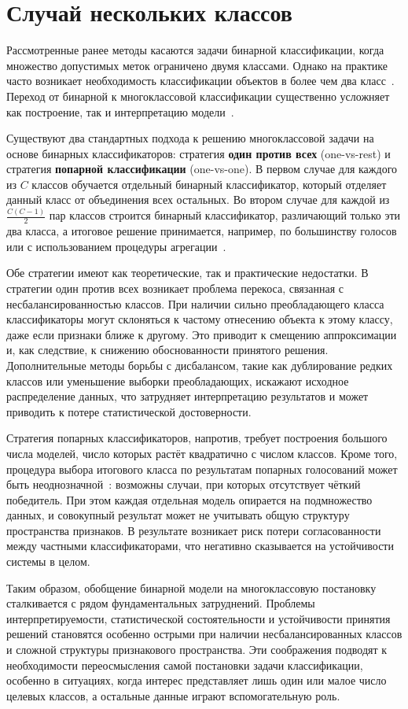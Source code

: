\section{Случай нескольких классов}\label{sec:ch1/multiclass_case}

Рассмотренные ранее методы касаются задачи бинарной классификации, когда множество допустимых меток ограничено двумя классами. Однако на практике часто возникает необходимость классификации объектов в более чем два класс~\cite{aly2005survey}. Переход от бинарной к многоклассовой классификации существенно усложняет как построение, так и интерпретацию модели~\cite{lorena2008review}.

Существуют два стандартных подхода к решению многоклассовой задачи на основе бинарных классификаторов: стратегия \textbf{один против всех} (one-vs-rest) и стратегия \textbf{попарной классификации} (one-vs-one). В первом случае для каждого из \(C\) классов обучается отдельный бинарный классификатор, который отделяет данный класс от объединения всех остальных. Во втором случае для каждой из \(\frac{C(C-1)}{2}\) пар классов строится бинарный классификатор, различающий только эти два класса, а итоговое решение принимается, например, по большинству голосов или с использованием процедуры агрегации~\cite{galar2011overview}.

Обе стратегии имеют как теоретические, так и практические недостатки. В стратегии один против всех возникает проблема перекоса, связанная с несбалансированностью классов. При наличии сильно преобладающего класса классификаторы могут склоняться к частому отнесению объекта к этому классу, даже если признаки ближе к другому. Это приводит к смещению аппроксимации и, как следствие, к снижению обоснованности принятого решения. Дополнительные методы борьбы с дисбалансом, такие как дублирование редких классов или уменьшение выборки преобладающих, искажают исходное распределение данных, что затрудняет интерпретацию результатов и может приводить к потере статистической достоверности.

Стратегия попарных классификаторов, напротив, требует построения большого числа моделей, число которых растёт квадратично с числом классов. Кроме того, процедура выбора итогового класса по результатам попарных голосований может быть неоднозначной~\cite{kang2015constructing}: возможны случаи, при которых отсутствует чёткий победитель. При этом каждая отдельная модель опирается на подмножество данных, и совокупный результат может не учитывать общую структуру пространства признаков. В результате возникает риск потери согласованности между частными классификаторами, что негативно сказывается на устойчивости системы в целом.

Таким образом, обобщение бинарной модели на многоклассовую постановку сталкивается с рядом фундаментальных затруднений. Проблемы интерпретируемости, статистической состоятельности и устойчивости принятия решений становятся особенно острыми при наличии несбалансированных классов и сложной структуры признакового пространства. Эти соображения подводят к необходимости переосмысления самой постановки задачи классификации, особенно в ситуациях, когда интерес представляет лишь один или малое число целевых классов, а остальные данные играют вспомогательную роль.
